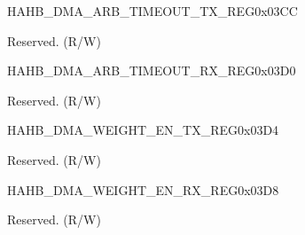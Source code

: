 \begin{register}{H}{AHB\_DMA\_ARB\_TIMEOUT\_TX\_REG}{0x03CC}\label{regdesc:AHBDMAARBTIMEOUTTXREG}
%
%
\regnewline%
\begin{regdesc}\begin{reglist}
\label{fielddesc:AHBDMAARBTIMEOUTTX}\item [AHB\_DMA\_ARB\_TIMEOUT\_TX] Reserved. (R/W)
\end{reglist}\end{regdesc}
\end{register}


\begin{register}{H}{AHB\_DMA\_ARB\_TIMEOUT\_RX\_REG}{0x03D0}\label{regdesc:AHBDMAARBTIMEOUTRXREG}
%
%
\regnewline%
\begin{regdesc}\begin{reglist}
\label{fielddesc:AHBDMAARBTIMEOUTRX}\item [AHB\_DMA\_ARB\_TIMEOUT\_RX] Reserved. (R/W)
\end{reglist}\end{regdesc}
\end{register}


\begin{register}{H}{AHB\_DMA\_WEIGHT\_EN\_TX\_REG}{0x03D4}\label{regdesc:AHBDMAWEIGHTENTXREG}
%
%
\regnewline%
\begin{regdesc}\begin{reglist}
\label{fielddesc:AHBDMAWEIGHTENTX}\item [AHB\_DMA\_WEIGHT\_EN\_TX] Reserved. (R/W)
\end{reglist}\end{regdesc}
\end{register}


\begin{register}{H}{AHB\_DMA\_WEIGHT\_EN\_RX\_REG}{0x03D8}\label{regdesc:AHBDMAWEIGHTENRXREG}
%
%
\regnewline%
\begin{regdesc}\begin{reglist}
\label{fielddesc:AHBDMAWEIGHTENRX}\item [AHB\_DMA\_WEIGHT\_EN\_RX] Reserved. (R/W)
\end{reglist}\end{regdesc}
\end{register}


